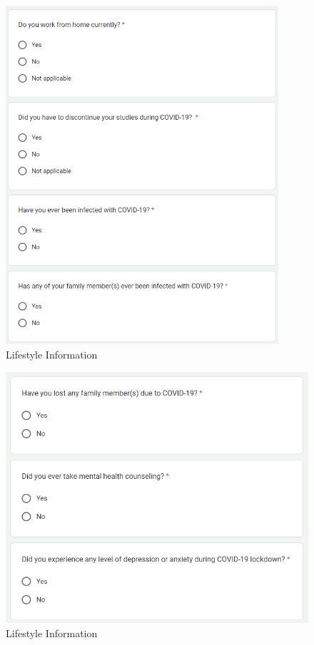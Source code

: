 \documentclass[12pt, english]{article}
\begin{document}
\begin{figure}[h]
\begin{minipage}{0.45\textwidth}
    \end{minipage}\hfill
    \begin{minipage}{0.45\textwidth}
        \centering
        \includegraphics[width=0.9\textwidth]{images/lifestyle_4.png} %
        
    \end{minipage}
    \caption{Lifestyle Information}
\end{figure}

\begin{figure}[h]
\includegraphics[scale=0.75]{images/lifestyle_5.png}
\centering
\caption{Lifestyle Information}
\end{figure}
\end{document}
